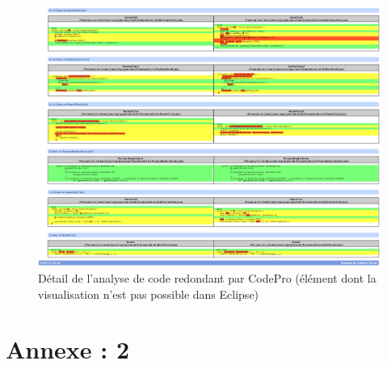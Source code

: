 \documentclass[12pt,a4paper,final]{article}
\begin{document}
\begin{figure}
	\centering
	\includegraphics[width=\textwidth]{images/SimilarCode_5.png}
	\caption{\label{SimilarCode5}Détail de l'analyse de code redondant par CodePro (élément dont la visualisation n'est pas possible dans Eclipse)}
\end{figure}

\newpage
\section{Annexe : 2}


\newpage


\end{document}
